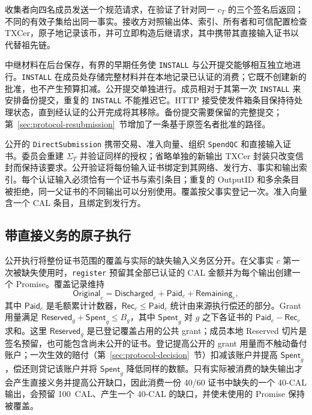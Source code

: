 收集者向四名成员发送一个规范请求，在验证了针对同一 $c_T$ 的三个签名后返回；不同的有效子集给出同一事实。接收方对照输出体、索引、所有者和可信配置检查 TXCer，原子地记录该币，并可立即构造后继请求，其中携带其直接输入证书以代替祖先链。

中继材料在后台保存，有界的早期任务使 \texttt{INSTALL} 与公开提交能够相互独立地进行。\texttt{INSTALL} 在成员处存储完整材料并在本地记录已认证的消费；它既不创建新的批准，也不产生预算扣减。公开提交单独进行。成员相对于其第一次 \texttt{INSTALL} 来安排备份提交，重复的 \texttt{INSTALL} 不能推迟它。HTTP 接受使发件箱条目保持待处理状态，直到经认证的公开完成将其移除。备份提交需要保留的完整提交；第~\ref{sec:protocol-resubmission}~节增加了一条基于原签名者批准的路径。

公开的 \texttt{DirectSubmission} 携带交易、准入向量、组织 \texttt{SpendQC} 和直接输入证书。委员会重建 $\Sigma_T$ 并验证同样的授权；省略单独的新输出 TXCer 封装只改变信封而保持该要求。公开验证将每份输入证书绑定到其网络、发行方、事实和输出索引。每个认证输入必须恰有一个证书与索引条目；重复的 OutputID 和多余条目被拒绝，同一父证书的不同输出可以分别使用。覆盖按父事实登记一次。准入向量含一个 CAL 条目，且绑定到发行方。
\subsection{带直接义务的原子执行}
\label{sec:protocol-execution}

公开执行将整份证书范围的覆盖与实际的缺失输入义务区分开。在父事实 $c$ 第一次被缺失使用时，\texttt{register} 预留其全部已认证的 CAL 金额并为每个输出创建一个 Promise。覆盖记录维持
\begin{equation}
  \mathsf{Original}_c=
  \mathsf{Discharged}_c+\mathsf{Paid}_c+\mathsf{Remaining}_c,
  \label{eq:protocol-coverage}
\end{equation}
其中 $\mathsf{Paid}_c$ 是毛额累计计数器，$\mathsf{Rec}_c\le\mathsf{Paid}_c$ 统计由来源执行偿还的部分。Grant 用量满足 $\mathsf{Reserved}_g+\mathsf{Spent}_g\le B_g$，其中 $\mathsf{Spent}_g$ 对 $g$ 之下各证书的 $\mathsf{Paid}_c-\mathsf{Rec}_c$ 求和。这里 $\mathsf{Reserved}_g$ 是已登记覆盖占用的公共 grant；成员本地 Reserved 切片是签名预留，也可能包含尚未公开的证书。登记提高公开的 grant 用量而不触动备付账户；一次生效的赔付（第~\ref{sec:protocol-decision}~节）扣减该账户并提高 $\mathsf{Spent}_g$，偿还则贷记该账户并将 $\mathsf{Spent}_g$ 降低同样的数额。只有实际被消费的缺失输出才会产生直接义务并提高公开缺口，因此消费一份 40/60 证书中缺失的一个 40-CAL 输出，会预留 100~CAL、产生一个 40-CAL 的缺口，并使未使用的 Promise 保持被覆盖。

